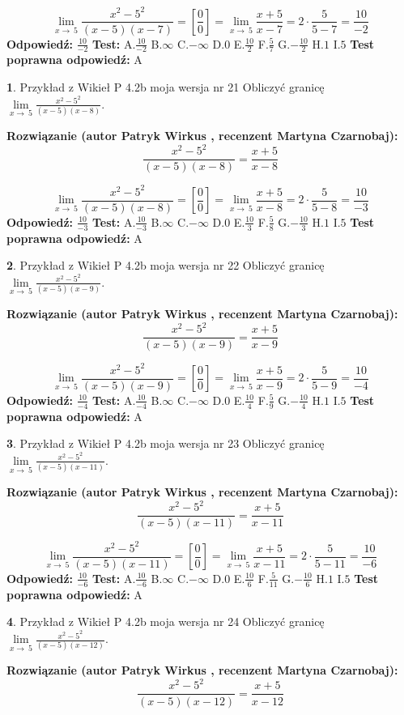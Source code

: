 \documentclass[12pt, a4paper]{article}
\theoremstyle{definition} %
\newtheorem{zad}{}
\newcommand{\zadStart}[1]{\begin{zad}#1\newline}
\newcommand{\zadStop}{\end{zad}}
\newcommand{\rozwStart}[2]{\noindent \textbf{Rozwiązanie (autor #1 , recenzent #2): }\newline}
\newcommand{\rozwStop}{\newline}
\newcommand{\odpStart}{\noindent \textbf{Odpowiedź:}\newline}
\newcommand{\odpStop}{\newline}
\newcommand{\testStart}{\noindent \textbf{Test:}\newline}
\newcommand{\testStop}{\newline}
\newcommand{\kluczStart}{\noindent \textbf{Test poprawna odpowiedź:}\newline}
\newcommand{\kluczStop}{\newline}
\begin{document}
$$\lim\limits_{x\to\ 5}\frac{x^{2}-5^{2}}{(x-5)(x-7)}=[\frac{0}{0}]=\lim\limits_{x\to\ 5}\frac{x+5}{x-7}=2 \cdot \frac{5}{5-7} = \frac{10}{-2}$$
\rozwStop
\odpStart
$\frac{10}{-2}$
\odpStop
\testStart
A.$\frac{10}{-2}$
B.$\infty$
C.$-\infty$
D.$0$
E.$\frac{10}{2}$
F.$\frac{5}{7}$
G.$-\frac{10}{2}$
H.$1$
I.$5$
\testStop
\kluczStart
A
\kluczStop



\zadStart{Przykład z Wikieł P 4.2b moja wersja nr 21}
Obliczyć granicę $\lim\limits_{x\to\ 5}\frac{x^{2}-5^{2}}{(x-5)(x-8)}$.
\zadStop
\rozwStart{Patryk Wirkus}{Martyna Czarnobaj}
$$\frac{x^{2}-5^{2}}{(x-5)(x-8)}=\frac{x+5}{x-8}$$

$$\lim\limits_{x\to\ 5}\frac{x^{2}-5^{2}}{(x-5)(x-8)}=[\frac{0}{0}]=\lim\limits_{x\to\ 5}\frac{x+5}{x-8}=2 \cdot \frac{5}{5-8} = \frac{10}{-3}$$
\rozwStop
\odpStart
$\frac{10}{-3}$
\odpStop
\testStart
A.$\frac{10}{-3}$
B.$\infty$
C.$-\infty$
D.$0$
E.$\frac{10}{3}$
F.$\frac{5}{8}$
G.$-\frac{10}{3}$
H.$1$
I.$5$
\testStop
\kluczStart
A
\kluczStop



\zadStart{Przykład z Wikieł P 4.2b moja wersja nr 22}
Obliczyć granicę $\lim\limits_{x\to\ 5}\frac{x^{2}-5^{2}}{(x-5)(x-9)}$.
\zadStop
\rozwStart{Patryk Wirkus}{Martyna Czarnobaj}
$$\frac{x^{2}-5^{2}}{(x-5)(x-9)}=\frac{x+5}{x-9}$$

$$\lim\limits_{x\to\ 5}\frac{x^{2}-5^{2}}{(x-5)(x-9)}=[\frac{0}{0}]=\lim\limits_{x\to\ 5}\frac{x+5}{x-9}=2 \cdot \frac{5}{5-9} = \frac{10}{-4}$$
\rozwStop
\odpStart
$\frac{10}{-4}$
\odpStop
\testStart
A.$\frac{10}{-4}$
B.$\infty$
C.$-\infty$
D.$0$
E.$\frac{10}{4}$
F.$\frac{5}{9}$
G.$-\frac{10}{4}$
H.$1$
I.$5$
\testStop
\kluczStart
A
\kluczStop



\zadStart{Przykład z Wikieł P 4.2b moja wersja nr 23}
Obliczyć granicę $\lim\limits_{x\to\ 5}\frac{x^{2}-5^{2}}{(x-5)(x-11)}$.
\zadStop
\rozwStart{Patryk Wirkus}{Martyna Czarnobaj}
$$\frac{x^{2}-5^{2}}{(x-5)(x-11)}=\frac{x+5}{x-11}$$

$$\lim\limits_{x\to\ 5}\frac{x^{2}-5^{2}}{(x-5)(x-11)}=[\frac{0}{0}]=\lim\limits_{x\to\ 5}\frac{x+5}{x-11}=2 \cdot \frac{5}{5-11} = \frac{10}{-6}$$
\rozwStop
\odpStart
$\frac{10}{-6}$
\odpStop
\testStart
A.$\frac{10}{-6}$
B.$\infty$
C.$-\infty$
D.$0$
E.$\frac{10}{6}$
F.$\frac{5}{11}$
G.$-\frac{10}{6}$
H.$1$
I.$5$
\testStop
\kluczStart
A
\kluczStop



\zadStart{Przykład z Wikieł P 4.2b moja wersja nr 24}
Obliczyć granicę $\lim\limits_{x\to\ 5}\frac{x^{2}-5^{2}}{(x-5)(x-12)}$.
\zadStop
\rozwStart{Patryk Wirkus}{Martyna Czarnobaj}
$$\frac{x^{2}-5^{2}}{(x-5)(x-12)}=\frac{x+5}{x-12}$$
\end{document}
